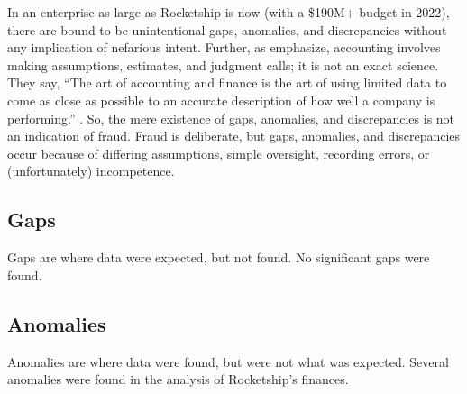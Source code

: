 In an enterprise as large as Rocketship is now (with a \$190M+ budget in 2022), there are bound to be unintentional gaps, anomalies, and discrepancies without any implication of nefarious intent. Further, as \citeauthor{Berman.Knight2013} emphasize, accounting involves making assumptions, estimates, and judgment calls; it is not an exact science. They say, ``The art of accounting and finance is the art of using limited data to come as close as possible to an accurate description of how well a company is performing.'' \parencite[4-5]{Berman.Knight2013}. So, the mere existence of gaps, anomalies, and discrepancies is not an indication of fraud. Fraud is deliberate, but gaps, anomalies, and discrepancies occur because of differing assumptions, simple oversight, recording errors, or (unfortunately)  incompetence.

\subsection{Gaps}%
\label{sec:gaps}\indent%

Gaps are where data were expected, but not found. No significant gaps were found.

\subsection{Anomalies}%
\label{sec:anomalies}\indent%

Anomalies are where data were found, but were not what was expected. Several anomalies were found in the analysis of Rocketship's finances.

